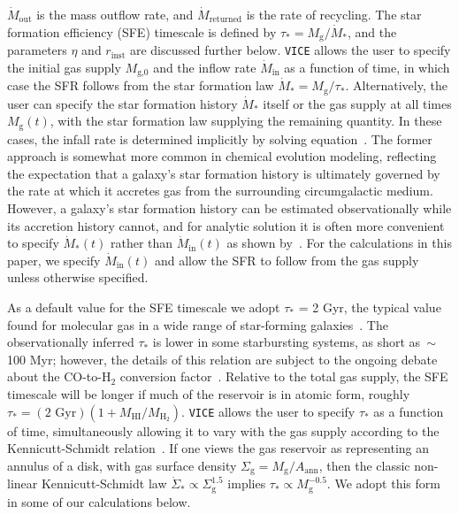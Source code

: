 $\dot{M}_\text{out}$ is the mass outflow rate, and $\dot{M}_\text{returned}$ 
is the rate of recycling. The star formation efficiency (SFE) timescale is 
defined by $\tau_* = M_\text{g}/\dot{M}_*$, and the parameters $\eta$ and 
$r_\text{inst}$ are discussed further below. 
\texttt{VICE} allows the user to specify the initial gas supply $M_\text{g,0}$ 
and the inflow rate $\dot{M}_\text{in}$ as a function of time, in which case 
the SFR follows from the star formation law $\dot{M}_* = M_\text{g}/\tau_*$. 
Alternatively, the user can specify the star formation history $\dot{M}_*$ 
itself or the gas supply at all times $M_\text{g}(t)$, with the star formation 
law supplying the remaining quantity. In these cases, the infall rate is 
determined implicitly by solving equation~. The former 
approach is somewhat more common in chemical evolution modeling, reflecting 
the expectation that a galaxy's star formation history is ultimately governed 
by the rate at which it accretes gas from the surrounding circumgalactic 
medium. However, a galaxy's star formation history can be estimated 
observationally while its accretion history cannot, and for analytic solution 
it is often more convenient to specify $\dot{M}_*(t)$ rather than 
$\dot{M}_\text{in}(t)$ as shown by~\citet{Weinberg2017b}. For the 
calculations in this paper, we specify $\dot{M}_\text{in}(t)$ and allow the 
SFR to follow from the gas supply unless otherwise specified. 
\par 
As a default value for the SFE timescale we adopt 
$\tau_*$ = 2 Gyr, the typical value found for molecular gas in a wide range of 
star-forming galaxies~\citep{Leroy2008}. The observationally inferred $\tau_*$ 
is lower in some starbursting systems, as short as~$\sim$100 Myr; however, the 
details of this relation are subject to the ongoing debate about the 
CO-to-H$_2$ conversion 
factor~\citep[for details, see the review in][]{Kennicutt2012}. 
Relative to the total gas supply, the SFE timescale will be longer if much of 
the reservoir is in atomic form, roughly 
$\tau_* = (\text{2 Gyr})(1 + M_\text{HI}/M_{\text{H}_2})$. 
\texttt{VICE} allows the 
user to specify $\tau_*$ as a function of time, simultaneously allowing it to 
vary with the gas supply according to the Kennicutt-Schmidt 
relation~\citep{Schmidt1959, Schmidt1963, Kennicutt1998}. If one views the 
gas reservoir as representing an annulus of a disk, with gas surface density 
$\Sigma_\text{g} = M_\text{g}/A_\text{ann}$, then the classic non-linear 
Kennicutt-Schmidt law $\dot{\Sigma}_* \propto \Sigma_\text{g}^{1.5}$ implies 
$\tau_* \propto M_\text{g}^{-0.5}$. We adopt this form in some of our 
calculations below. 

